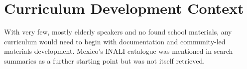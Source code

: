 \documentclass[12pt]{article}
\begin{document}
\section{Curriculum Development Context}
With very few, mostly elderly speakers and no found school materials, any curriculum would need to begin with documentation and community-led materials development. Mexico's INALI catalogue was mentioned in search summaries as a further starting point but was not itself retrieved.
\end{document}
